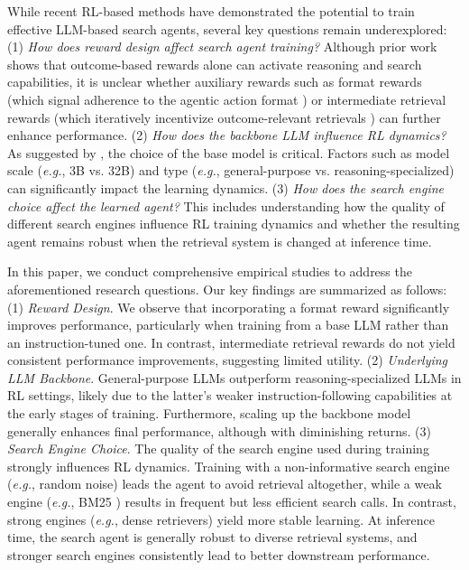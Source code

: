 While recent RL-based methods have demonstrated the potential to train effective LLM-based search agents, several key questions remain underexplored:
(1) \textit{How does reward design affect search agent training?}
Although prior work \cite{jin2025search} shows that outcome-based rewards alone can activate reasoning and search capabilities, it is unclear whether auxiliary rewards such as format rewards (which signal adherence to the agentic action format \cite{guo2025deepseek}) or intermediate retrieval rewards (which iteratively incentivize outcome-relevant retrievals \cite{lin2025rec}) can further enhance performance. 
(2) \textit{How does the backbone LLM influence RL dynamics?}
As suggested by \cite{gandhi2025cognitive}, the choice of the base model is critical. 
Factors such as model scale (\textit{e.g.}, 3B vs. 32B) and type (\textit{e.g.}, general-purpose vs. reasoning-specialized) can significantly impact the learning dynamics.
(3) \textit{How does the search engine choice affect the learned agent?}
This includes understanding how the quality of different search engines influence RL training dynamics and whether the resulting agent remains robust when the retrieval system is changed at inference time.

In this paper, we conduct comprehensive empirical studies to address the aforementioned research questions. 
Our key findings are summarized as follows:
(1) \textit{Reward Design}. We observe that incorporating a format reward significantly improves performance, particularly when training from a base LLM rather than an instruction-tuned one. 
In contrast, intermediate retrieval rewards do not yield consistent performance improvements, suggesting limited utility.
(2) \textit{Underlying LLM Backbone}. General-purpose LLMs outperform reasoning-specialized LLMs in RL settings, likely due to the latter’s weaker instruction-following capabilities at the early stages of training. 
Furthermore, scaling up the backbone model generally enhances final performance, although with diminishing returns.
(3) \textit{Search Engine Choice}. The quality of the search engine used during training strongly influences RL dynamics. 
Training with a non-informative search engine (\textit{e.g.}, random noise) leads the agent to avoid retrieval altogether, while a weak engine (\textit{e.g.}, BM25 \cite{robertson2009probabilistic}) results in frequent but less efficient search calls. 
In contrast, strong engines (\textit{e.g.}, dense retrievers) yield more stable learning. 
At inference time, the search agent is generally robust to diverse retrieval systems, and stronger search engines consistently lead to better downstream performance.

